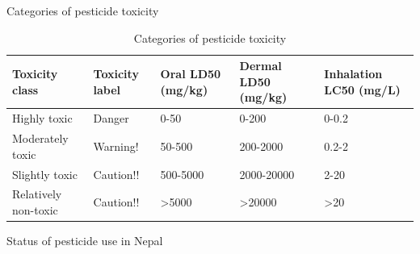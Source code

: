 \documentclass[
  openany]{book}
\begin{document}
Categories of pesticide toxicity

\begin{table}

\caption{\label{tab:pesticide-hazard-category}Categories of pesticide toxicity}
\centering
\begin{tabular}[t]{lllll}
\toprule
Toxicity class & Toxicity label & Oral LD50 (mg/kg) & Dermal LD50 (mg/kg) & Inhalation LC50 (mg/L)\\
\midrule
Highly toxic & Danger & 0-50 & 0-200 & 0-0.2\\
Moderately toxic & Warning! & 50-500 & 200-2000 & 0.2-2\\
Slightly toxic & Caution!! & 500-5000 & 2000-20000 & 2-20\\
Relatively non-toxic & Caution!! & >5000 & >20000 & >20\\
\bottomrule
\end{tabular}
\end{table}

Status of pesticide use in Nepal
\end{document}
